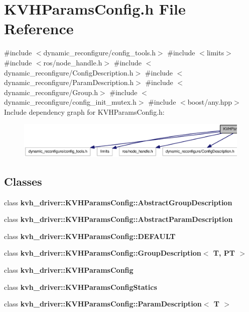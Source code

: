 \section{\-K\-V\-H\-Params\-Config.\-h \-File \-Reference}
\label{KVHParamsConfig_8h}
{\ttfamily \#include $<$dynamic\-\_\-reconfigure/config\-\_\-tools.\-h$>$}\*
{\ttfamily \#include $<$limits$>$}\*
{\ttfamily \#include $<$ros/node\-\_\-handle.\-h$>$}\*
{\ttfamily \#include $<$dynamic\-\_\-reconfigure/\-Config\-Description.\-h$>$}\*
{\ttfamily \#include $<$dynamic\-\_\-reconfigure/\-Param\-Description.\-h$>$}\*
{\ttfamily \#include $<$dynamic\-\_\-reconfigure/\-Group.\-h$>$}\*
{\ttfamily \#include $<$dynamic\-\_\-reconfigure/config\-\_\-init\-\_\-mutex.\-h$>$}\*
{\ttfamily \#include $<$boost/any.\-hpp$>$}\*
\-Include dependency graph for \-K\-V\-H\-Params\-Config.\-h\-:\nopagebreak
\begin{figure}[H]
\begin{center}
\leavevmode
\includegraphics[width=350pt]{KVHParamsConfig_8h__incl}
\end{center}
\end{figure}
\subsection*{\-Classes}
\begin{DoxyCompactItemize}
\item 
class {\bf kvh\-\_\-driver\-::\-K\-V\-H\-Params\-Config\-::\-Abstract\-Group\-Description}
\item 
class {\bf kvh\-\_\-driver\-::\-K\-V\-H\-Params\-Config\-::\-Abstract\-Param\-Description}
\item 
class {\bf kvh\-\_\-driver\-::\-K\-V\-H\-Params\-Config\-::\-D\-E\-F\-A\-U\-L\-T}
\item 
class {\bf kvh\-\_\-driver\-::\-K\-V\-H\-Params\-Config\-::\-Group\-Description$<$ T, P\-T $>$}
\item 
class {\bf kvh\-\_\-driver\-::\-K\-V\-H\-Params\-Config}
\item 
class {\bf kvh\-\_\-driver\-::\-K\-V\-H\-Params\-Config\-Statics}
\item 
class {\bf kvh\-\_\-driver\-::\-K\-V\-H\-Params\-Config\-::\-Param\-Description$<$ T $>$}
\end{DoxyCompactItemize}
